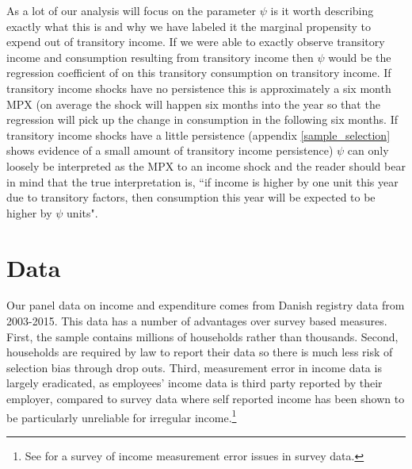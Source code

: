\documentclass[titlepage]{\econtex}\newcommand{\texname}{ConsumptionHeterogeneity}
\begin{document}
As a lot of our analysis will focus on the parameter $\psi$ is it worth describing exactly what this is and why we have labeled it the marginal propensity to expend out of transitory income. If we were able to exactly observe transitory income and consumption resulting from transitory income then $\psi$ would be the regression coefficient of on this transitory consumption on transitory income. If transitory income shocks have no persistence this is approximately a six month MPX (on average the shock will happen six months into the year so that the regression will pick up the change in consumption in the following six months. If transitory income shocks have a little persistence (appendix \ref{sample_selection} shows evidence of a small amount of transitory income persistence) $\psi$ can only loosely be interpreted as the MPX to an income shock and the reader should bear in mind that the true interpretation is, ``if income is higher by one unit this year due to transitory factors, then consumption this year will be expected to be higher by $\psi$ units".

\section{Data}
Our panel data on income and expenditure comes from Danish registry data from 2003-2015. This data has a number of advantages over survey based measures. First, the sample contains millions of households rather than thousands. Second, households are required by law to report their data so there is much less risk of selection bias through drop outs. Third, measurement error in income data is largely eradicated, as employees' income data is third party reported by their employer, compared to survey data where self reported income has been shown to be particularly unreliable for irregular income.\footnote{See \cite{david_income_nodate} for a survey of income measurement error issues in survey data.}
\end{document}
